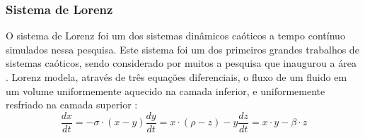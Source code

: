 \documentclass{article}
\begin{document}
\subsubsection{Sistema de Lorenz}

O sistema de Lorenz foi um dos sistemas dinâmicos caóticos a tempo contínuo simulados nessa pesquisa. Este sistema foi um dos primeiros grandes trabalhos de sistemas caóticos, sendo considerado por muitos a pesquisa que inaugurou a área \cite{gleick1998chaos}. Lorenz modela, através de três equações diferenciais, o fluxo de um fluido em um volume uniformemente aquecido na camada inferior, e uniformemente resfriado na camada superior \cite{lorenz1963deterministic}:
\begin{subequations}
\begin{equation}
\frac{dx}{dt} = -\sigma \cdot (x - y)
\end{equation}
\begin{equation}
\frac{dy}{dt} = x \cdot (\rho - z) - y
\end{equation}
\begin{equation}
\frac{dz}{dt} = x \cdot y - \beta \cdot z
\end{equation}
\end{subequations}
\end{document}
